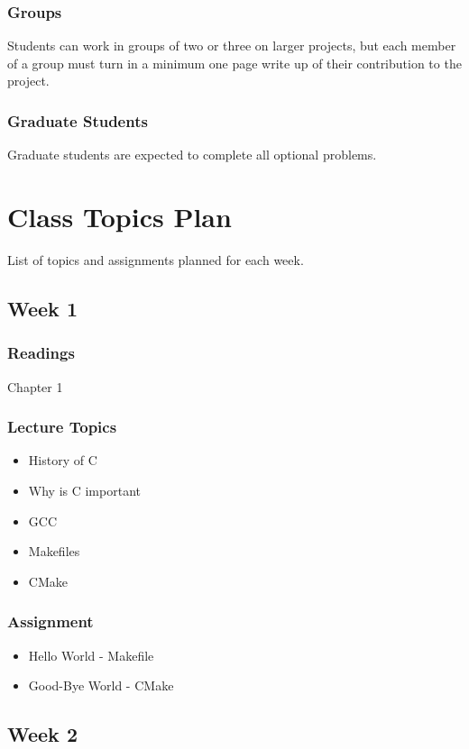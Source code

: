 \documentclass[a4paper,12pt]{report}
\begin{document}
\subsubsection*{Groups}
Students can work in groups of two or three on larger projects, but each member of a group must turn in a minimum one page write up of their contribution to the project.

\subsubsection*{Graduate Students}
Graduate students are expected to complete all optional problems.

\section*{Class Topics Plan}
List of topics and assignments planned for each week.

\subsection*{Week 1}
\subsubsection*{ Readings }
Chapter 1
\subsubsection*{Lecture Topics}
\begin{itemize}
\item History of C
\item Why is C important
\item GCC
\item Makefiles
\item CMake
\end{itemize}
\subsubsection*{Assignment}
\begin{itemize}
\item Hello World - Makefile
\item Good-Bye World - CMake
\end{itemize}

\subsection*{Week 2}
\end{document}
